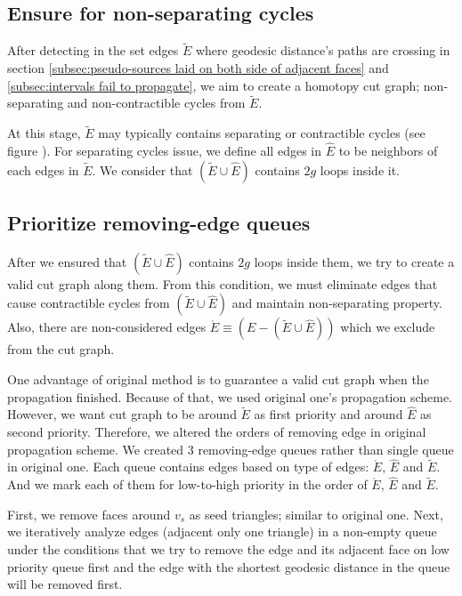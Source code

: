 \documentclass[a4paper,twoside]{article}
\begin{document}
\subsection{Ensure for non-separating cycles}
\label{subsec:ensure non-trivia}
After detecting in the set edges $\tilde{E}$ where geodesic distance's paths are crossing in section \ref{subsec:pseudo-sources laid on both side of adjacent faces} and \ref{subsec:intervals fail to propagate}, we aim to create a homotopy cut graph; non-separating and non-contractible cycles from $\tilde{E}$.

At this stage, $\tilde{E}$ may typically contains separating or contractible cycles (see figure ).  For separating cycles issue, we define all edges in $\hat{E}$ to be neighbors of each edges in $\tilde{E}$. We consider that $(\tilde{E} \cup \hat{E})$ contains $2g$ loops inside it.  

\subsection{Prioritize removing-edge queues}
After we ensured that $(\tilde{E} \cup \hat{E})$ contains $2g$ loops inside them, we try to create a valid cut graph along them. From this condition, we must eliminate edges that cause contractible cycles from $(\tilde{E} \cup \hat{E})$ and maintain non-separating property. Also, there are non-considered edges $\acute{E} \equiv (E - (\tilde{E} \cup \hat{E}))$ which we exclude from the cut graph.

One advantage of original method is to guarantee a valid cut graph when the propagation finished. Because of that, we used original one's propagation scheme. However, we want cut graph to be around $\tilde{E}$ as first priority and around $\hat{E}$ as second priority. Therefore, we altered the orders of removing edge in original propagation scheme. We created 3 removing-edge queues rather than single queue in original one. Each queue contains edges based on type of edges: 
$\acute{E}$, $\hat{E}$ and $\tilde{E}$.  And we mark each of them for low-to-high priority in the order of $\acute{E}$, $\hat{E}$ and $\tilde{E}$.

First, we remove faces around $v_s$ as seed triangles; similar to original one. Next, we iteratively analyze edges (adjacent only one triangle) in a non-empty queue under the conditions that we try to remove the edge and its adjacent face on low priority queue first and the edge with the shortest geodesic distance in the queue will be removed first.
\end{document}
